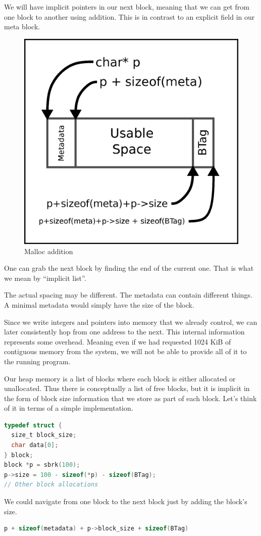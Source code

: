 We will have implicit pointers in our next block, meaning that we can get from one block to another using addition.
This is in contrast to an explicit  field in our meta block.

\begin{figure}[H]
\centering
\includegraphics[width=.5\textwidth]{malloc/drawings/malloc_addition.eps}
\caption{Malloc addition}
\end{figure}

One can grab the next block by finding the end of the current one.
That is what we mean by ``implicit list''.

The actual spacing may be different.
The metadata can contain different things.
A minimal metadata would simply have the size of the block.

Since we write integers and pointers into memory that we already control, we can later consistently hop from one address to the next.
This internal information represents some overhead.
Meaning even if we had requested 1024 KiB of contiguous memory from the system, we will not be able to provide all of it to the running program.

Our heap memory is a list of blocks where each block is either allocated or unallocated.
Thus there is conceptually a list of free blocks, but it is implicit in the form of block size information that we store as part of each block.
Let's think of it in terms of a simple implementation.
\begin{lstlisting}[language=C]
typedef struct {
  size_t block_size;
  char data[0];
} block;
block *p = sbrk(100);
p->size = 100 - sizeof(*p) - sizeof(BTag);
// Other block allocations
\end{lstlisting}

We could navigate from one block to the next block just by adding the block's size.

\begin{lstlisting}[language=C]
p + sizeof(metadata) + p->block_size + sizeof(BTag)
\end{lstlisting}


